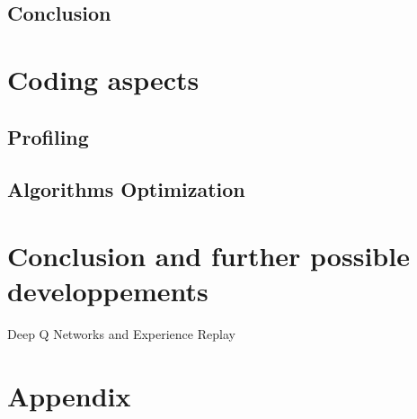 \documentclass[12pt,a4paper]{article}
\begin{document}
\subsection{Conclusion}

\section{Coding aspects}
\subsection{Profiling}

\subsection{Algorithms Optimization}


\section{Conclusion and further possible developpements}
Deep Q Networks and Experience Replay \cite{mnih-dqn-2015}


\newpage
\section{Appendix}
\newpage
\nocite{*}


\end{document}
